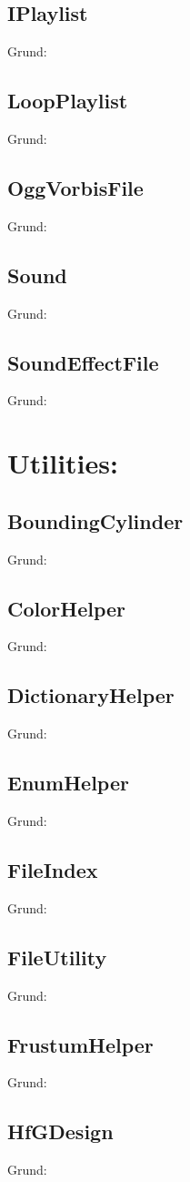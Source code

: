 \subsection{IPlaylist}
Grund:
\subsection{LoopPlaylist}
Grund:
\subsection{OggVorbisFile}
Grund:
\subsection{Sound}
Grund:
\subsection{SoundEffectFile}
Grund:

\section{Utilities:}
\subsection{BoundingCylinder}
Grund:
\subsection{ColorHelper}
Grund:
\subsection{DictionaryHelper}
Grund:
\subsection{EnumHelper}
Grund:
\subsection{FileIndex}
Grund:
\subsection{FileUtility}
Grund:
\subsection{FrustumHelper}
Grund:
\subsection{HfGDesign}
Grund:
